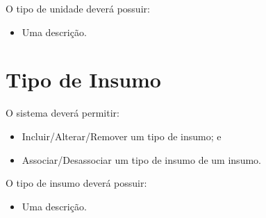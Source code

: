 O tipo de unidade deverá possuir:

\begin{itemize}
	\item Uma descrição.
\end{itemize}

\section{Tipo de Insumo}

O sistema deverá permitir:

\begin{itemize}
	\item Incluir/Alterar/Remover um tipo de insumo; e
	\item Associar/Desassociar um tipo de insumo de um insumo.
\end{itemize}

O tipo de insumo deverá possuir:

\begin{itemize}
	\item Uma descrição.
\end{itemize}